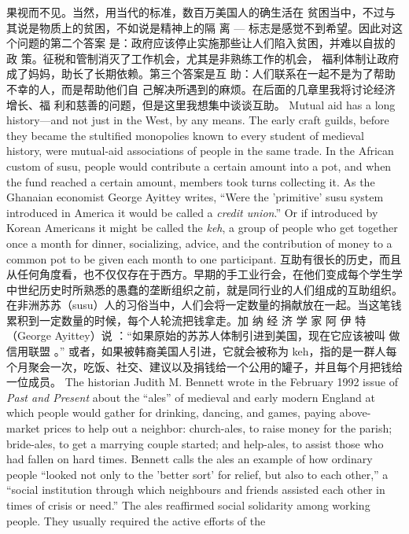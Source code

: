 \begin{paracol}{2}
果视而不见。当然，用当代的标准，数百万美国人的确生活在
贫困当中，不过与其说是物质上的贫困，不如说是精神上的隔
离 --- 标志是感觉不到希望。因此对这个问题的第二个答案
是：政府应该停止实施那些让人们陷入贫困，并难以自拔的政
策。征税和管制消灭了工作机会，尤其是非熟练工作的机会，
福利体制让政府成了妈妈，助长了长期依赖。第三个答案是互
助：人们联系在一起不是为了帮助不幸的人，而是帮助他们自
己解决所遇到的麻烦。在后面的几章里我将讨论经济增长、福
利和慈善的问题，但是这里我想集中谈谈互助。
\switchcolumn*
Mutual aid has a long history---and not just in the West, by
any means. The early craft guilds, before they became the stultified monopolies known to every student of medieval history,
were mutual-aid associations of people in the same trade. In the
African custom of susu, people would contribute a certain
amount into a pot, and when the fund reached a certain
amount, members took turns collecting it. As the Ghanaian
economist George Ayittey writes, ``Were the 'primitive' susu
system introduced in America it would be called a \textit{credit union}.''
Or if introduced by Korean Americans it might be called the
\textit{keh}, a group of people who get together once a month for dinner, socializing, advice, and the contribution of money to a
common pot to be given each month to one participant.
\switchcolumn
互助有很长的历史，而且从任何角度看，也不仅仅存在于西方。早期的手工业行会，在他们变成每个学生学中世纪历史时所熟悉的愚蠢的垄断组织之前，就是同行业的人们组成的互助组织。在非洲苏苏（susu）人的习俗当中，人们会将一定数量的捐献放在一起。当这笔钱累积到一定数量的时候，每个人轮流把钱拿走。加 纳 经 济 学 家 阿 伊 特 （George  Ayittey）说 ：“如果原始的苏苏人体制引进到美国，现在它应该被叫 做信用联盟 。” 或者，如果被韩裔美国人引进，它就会被称为 keh，指的是一群人每个月聚会一次，吃饭、社交、建议以及捐钱给一个公用的罐子，并且每个月把钱给一位成员。
\switchcolumn*
The historian Judith M. Bennett wrote in the February 1992
issue of \textit{Past and Present} about the ``ales'' of medieval and early
modern England at which people would gather for drinking,
dancing, and games, paying above-market prices to help out a
neighbor: church-ales, to raise money for the parish; bride-ales,
to get a marrying couple started; and help-ales, to assist those
who had fallen on hard times. Bennett calls the ales an example
of how ordinary people ``looked not only to the 'better sort' for
relief, but also to each other,'' a ``social institution through
which neighbours and friends assisted each other in times of crisis or need.'' The ales reaffirmed social solidarity among working people. They usually required the active efforts of the

\end{paracol}
